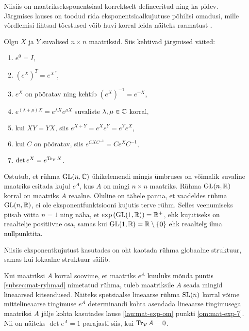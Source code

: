 Niisiis on maatrikseksponentsiaal korrektselt defineeritud ning ka pidev.
Järgmises lauses on toodud rida eksponentsiaalkujutuse põhilisi omadusi,
mille võrdlemisi lihtsad tõestused võib huvi korral leida näiteks
raamatust \cite{hall2003lie}.

\begin{lau}\label{lau:mat-exp-om}
    Olgu $X$ ja $Y$ suvalised $n \times n$ maatriksid. Siis kehtivad järgmised
    väited:
    \begin{enumerate}[label=\arabic*)]
        \item\label{om:mat-exp-1} $e^0 = I$,
        \item\label{om:mat-exp-2} $\left(e^X\right)^T = e^{X^T}$,
        \item\label{om:mat-exp-3} $e^X$ on pööratav ning kehtib
            $\left(e^X\right)^{-1} = e^{-X}$,
        \item\label{om:mat-exp-4} $e^{(\lambda + \mu)X} =
            e^{\lambda X} e^{\mu X}$ suvaliste $\lambda, \mu \in \mathbb{C}$ korral,
        \item\label{om:mat-exp-5} kui $XY = YX$, siis
            $e^{X+Y} = e^X e^Y = e^Y e^X$,
        \item\label{om:mat-exp-6}  kui $C$ on pööratav, siis
            $e^{CXC^{-1}} = C e^X C^{-1}$,
        \item\label{om:mat-exp-7} $\det e^X = e^{\operatorname{Tr}_{\mathcal{V}} X}$.
    \end{enumerate}
\end{lau}

Ostutub, et rühma $\operatorname{GL}(n, \mathbb{C})$ ühikelemendi mingis ümbruses on võimalik
suvaline maatriks esitada kujul $e^A$, kus $A$ on mingi $n \times n$
maatriks. Rühma $\operatorname{GL}(n, \mathbb{R})$ korral on maatriks $A$ reaalne. Oluline on
tähele panna, et vaadeldes rühma $\operatorname{GL}(n, \mathbb{R})$, ei ole eksponentfunktsiooni
kujutis terve rühm. Selles veenumiseks piisab võtta $n = 1$ ning näha, et
$\exp \left(\operatorname{GL}(1, \mathbb{R})\right) = \mathbb{R}^+$, ehk kujutiseks on reaaltelje positiivne
osa, samas kui $\operatorname{GL}(1, \mathbb{R}) = \mathbb{R} \setminus \{0\}$ ehk reaaltelg ilma
nullpunktita.

Niisiis eksponentkujutust kasutades on oht kaotada rühma globaalne struktuur,
samas kui lokaalne struktuur säilib.

Kui maatriksi $A$ korral soovime, et maatriks $e^A$ kuuluks mõnda puntis
\ref{subsec:mat-ryhmad}  nimetatud rühma, tuleb
maatriksile $A$ seada mingid lineaarsed kitsendused. Näiteks spetsiaalse
lineaarse rühma $\operatorname{SL}(n)$ korral võime mittelineaarse tingimuse $e^A$
determinandi kohta asendada lineaarse tingimusega maatriksi $A$ jälje kohta
kasutades lause \ref{lau:mat-exp-om} punkti \ref{om:mat-exp-7}. Nii on näiteks
$\det e^A = 1$ parajasti siis, kui $\operatorname{Tr}_{\mathcal{V}} A = 0$.

